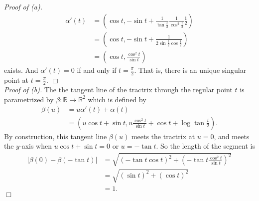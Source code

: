 \documentclass{article}
\begin{document}
\emph{Proof of (a).}
\begin{align*}
  \alpha'(t)
  &= \left(
    \cos t,
    -\sin t + \frac{1}{\tan\frac{t}{2}} \frac{1}{\cos^{2}\frac{t}{2}} \frac{1}{2}
  \right) \\
  &= \left(
    \cos t,
    -\sin t + \frac{1}{2 \sin\frac{t}{2} \cos\frac{t}{2}}
  \right) \\
  &= \left(
    \cos t,
    \frac{\cos^2 t}{\sin t}
  \right)
\end{align*}
exists.
And $\alpha'(t) = 0$ if and only if $t = \frac{\pi}{2}$.
That is, there is an unique singular point at $t = \frac{\pi}{2}$.
$\Box$ \\



\emph{Proof of (b).}
The the tangent line of the tractrix through the regular point $t$
is parametrized by $\beta: \mathbb{R} \to \mathbb{R}^2$ which is defined by
\begin{align*}
  \beta(u)
  &= u\alpha'(t) + \alpha(t) \\
  &= \left( u \cos t + \sin t, u \frac{\cos^2 t}{\sin t} + \cos t + \log\tan\frac{t}{2} \right).
\end{align*}
By construction, this tangent line $\beta(u)$ meets the tractrix at $u = 0$,
and meets the $y$-axis when $u \cos t + \sin t = 0$ or $u = -\tan t$.
So the length of the segment is
\begin{align*}
  |\beta(0) - \beta(-\tan t)|
  &= \sqrt{(-\tan t \cos t)^2+ \left( -\tan t \frac{\cos^2 t}{\sin t} \right)^2} \\
  &= \sqrt{(\sin t)^2+ (\cos t)^2} \\
  &= 1.
\end{align*}
$\Box$ \\\\



\end{document}

